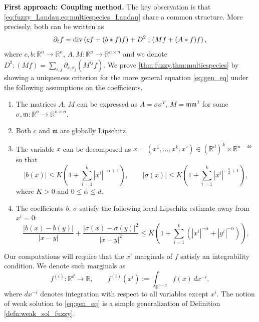 \documentclass[10pt,oneside]{amsart}
\numberwithin{equation}{section}
\numberwithin{definition}{section}
\numberwithin{theorem}{section}
\numberwithin{lemma}{section}
\begin{document}
\textbf{First approach: Coupling method.} The key observation is that \cref{eq:fuzzy_Landau,eq:multiespecies_Landau} share a common structure.  More precisely, both can be written as
% 
\begin{equation}\label{eq:gen_eq}
  \partial_{t}f=\textnormal{div}\left(cf+(b*f)f\right)+D^{2}:\left(Mf+(A*f)f\right),
\end{equation}
% 
where $c,b:\mathbb{R}^{n}\longrightarrow\mathbb{R}^{n}$, $A,M:\mathbb{R}^{n}\longrightarrow\mathbb{R}^{n\times n}$ and we denote ${D^2:(Mf) = \sum_{i,j} \partial_{x_ix_j}(M^{ij}f)}$. We prove \cref{thm:fuzzy,thm:multiespecies} by showing a uniqueness criterion for the more general equation \cref{eq:gen_eq} under the following assumptions on the coefficients.
% 
\begin{enumerate}[label=(A\arabic*),ref=A\arabic*]
  \item \label{ass:PSD} The matrices $A$, $M$ can be expressed as ${A=\sigma\sigma^{T}}$, ${M=\mathfrak m \mathfrak m^{T}}$ for some $\sigma,\mathfrak m:\mathbb{R}^{n}\longrightarrow\mathbb{R}^{n\times n}$.
  \item \label{ass:Lipschitz} Both $c$ and $\mathfrak m$ are globally Lipschitz.
  \item \label{ass:growth} The variable $x$ can be decomposed as $x=(x^{1},\ldots,x^{k},x')\in(\mathbb{R}^{d})^{k}\times\mathbb{R}^{n-dk}$ so that
    \[
      |b(x)|\leq K\left(1+\sum_{i=1}^{k}|x^{i}|^{-\alpha+1}\right),\qquad
      |\sigma(x)|\leq K\left(1+\sum_{i=1}^{k}|x^{i}|^{-\frac{\alpha}{2}+1}\right),
    \]
    where $K>0$ and $0\leq \alpha \leq d$.
    \item \label{ass:local_Lipchitz} The coefficients $b$, $\sigma$ satisfy the following local Lipschitz estimate away from $x^{i}=0$:
    \begin{equation*}
      \frac{|b(x)-b(y)|}{|x-y|} + \frac{|\sigma(x)-\sigma(y)|^2}{|x-y|^2}\leq K\left(1+\sum_{i=1}^{k}\left(|x^{i}|^{-\alpha}+|y^{i}|^{-\alpha}\right)\right),
    \end{equation*}
\end{enumerate}
% 
Our computations will require that the $x^i$ marginals of $f$ satisfy an integrability condition. We denote such marginals as
%
\begin{equation*}
  f^{(i)}:\mathbb{R}^{d}\longrightarrow\mathbb{R},\qquad f^{(i)}(x^{i}):=\int_{\mathbb{R}^{n-d}}f(x)\,dx^{-i},
\end{equation*}
%
where $dx^{-i}$ denotes integration with respect to all variables except $x^{i}$. The notion of weak solution to \eqref{eq:gen_eq} is a simple generalization of Definition \ref{defn:weak_sol_fuzzy}.
\end{document}
